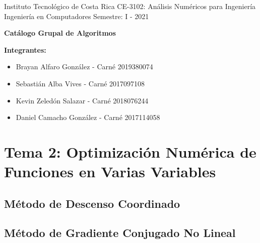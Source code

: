\documentclass[10pt]{article}
\begin{document}
Instituto Tecnológico de Costa Rica \hfill
CE-3102: Análisis Numéricos para Ingeniería\\
Ingeniería en Computadores \hfill 
Semestre: I - 2021\\




\begin{center}\textbf{\huge Catálogo Grupal de Algoritmos}  \end{center}

{\bf Integrantes: }
\begin{itemize}
\item Brayan Alfaro González - Carné 2019380074
\item Sebastián Alba Vives - Carné 2017097108 
\item Kevin Zeledón Salazar - Carné 2018076244 
\item Daniel Camacho González - Carné 2017114058
\end{itemize}


\section{Tema 2: Optimización Numérica
de Funciones en Varias Variables}

\subsection{Método de Descenso Coordinado}



\newpage

\subsection{Método de Gradiente Conjugado No Lineal}



\newpage
\end{document}
